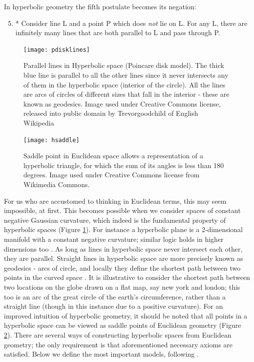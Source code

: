 \documentclass[12pt]{report}
\begin{document}
In hyperbolic geometry the fifth postulate becomes its negation: 

\begin{enumerate}
   \setcounter{enumi}{4}
   \item * Consider line L and a point P which does \textit{not} lie on L. For any L, there are infinitely many lines that are both parallel to L and pass through P.
 \end{enumerate}

\begin{figure}
  \centering
	\texttt{[image: pdisklines]}
	\caption{Parallel lines in Hyperbolic space (Poincare disk model). The thick blue line is parallel to all the other lines since it never intersects any of them in the hyperbolic space (interior of the circle). All the lines are arcs of circles of different sizes that fall in the interior - these are known as geodesics. Image used under Creative Commons license, released into public domain by Trevorgoodchild of English Wikipedia}
	\label{fig:disklines}
\end{figure}

\begin{figure}
  \centering
	\texttt{[image: hsaddle]}
	\caption{Saddle point in Euclidean space allows a representation of a hyperbolic triangle, for which the sum of its angles is less than 180 degrees. Image used under Creative Commons license from Wikimedia Commons.}
	\label{fig:hsaddle}
\end{figure}

For us who are accustomed to thinking in Euclidean terms, this may seem impossible, at first. This becomes possible when we consider spaces of constant negative Gaussian curvature, which indeed is the fundamental property of hyperbolic spaces (Figure \ref{fig:disklines}). For instance a hyperbolic plane is a 2-dimensional manifold with a constant negative curvature; similar logic holds in higher dimensions too \cite{Stillwell1991}. As long as lines in hyperbolic space never intersect each other, they are parallel. Straight lines in hyperbolic space are more precisely known as geodesics - arcs of circle, and locally they define the shortest path between two points in the curved space \cite{Stillwell1991}. It is illustrative to consider the shortest path between two locations on the globe drawn on a flat map, say new york and london; this too is an arc of the great circle of the earth's circumference, rather than a straight line (though in this instance due to a positive curvature). For an improved intuition of hyperbolic geometry, it should be noted that all points in a hyperbolic space can be viewed as saddle points of Euclidean geometry (Figure \ref{fig:hsaddle}). There are several ways of constructing hyperbolic spaces from Euclidean geometry; the only requirement is that aforementioned necessary axioms are satisfied. Below we define the most important models, following \cite{Greenberg1994}.
\end{document}
